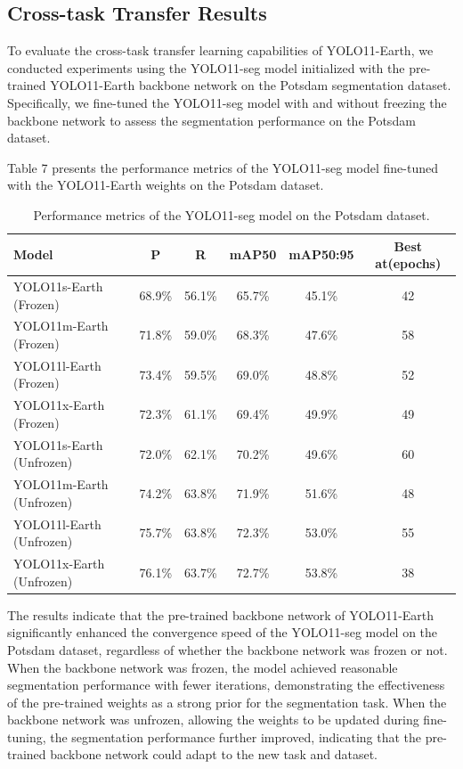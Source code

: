 \documentclass{article}
\begin{document}
\subsection{Cross-task Transfer Results}
To evaluate the cross-task transfer learning capabilities of YOLO11-Earth, we conducted experiments using the 
YOLO11-seg model initialized with the pre-trained YOLO11-Earth backbone network on the Potsdam segmentation 
dataset. Specifically, we fine-tuned the YOLO11-seg model with and without freezing the backbone network to 
assess the segmentation performance on the Potsdam dataset.

Table 7 presents the performance metrics of the YOLO11-seg model fine-tuned with the YOLO11-Earth weights on the Potsdam dataset.
\begin{table}[ht]
\centering
\caption{Performance metrics of the YOLO11-seg model on the Potsdam dataset.}
\begin{tabular}{lccccc}
\toprule
\textbf{Model} & \textbf{P} & \textbf{R} & \textbf{mAP50} & \textbf{mAP50:95} & \textbf{Best at(epochs)} \\
\midrule
YOLO11s-Earth (Frozen) & 68.9\% & 56.1\% & 65.7\% & 45.1\% & 42 \\
YOLO11m-Earth (Frozen) & 71.8\% & 59.0\% & 68.3\% & 47.6\% & 58 \\
YOLO11l-Earth (Frozen) & 73.4\% & 59.5\% & 69.0\% & 48.8\% & 52 \\
YOLO11x-Earth (Frozen) & 72.3\% & 61.1\% & 69.4\% & 49.9\% & 49 \\
YOLO11s-Earth (Unfrozen) & 72.0\% & 62.1\% & 70.2\% & 49.6\% & 60 \\
YOLO11m-Earth (Unfrozen) & 74.2\% & 63.8\% & 71.9\% & 51.6\% & 48 \\
YOLO11l-Earth (Unfrozen) & 75.7\% & 63.8\% & 72.3\% & 53.0\% & 55 \\
YOLO11x-Earth (Unfrozen) & 76.1\% & 63.7\% & 72.7\% & 53.8\% & 38 \\
\bottomrule
\end{tabular}
\end{table}
The results indicate that the pre-trained backbone network of YOLO11-Earth significantly enhanced the convergence 
speed of the YOLO11-seg model on the Potsdam dataset, regardless of whether the backbone network was frozen or 
not. When the backbone network was frozen, the model achieved reasonable segmentation performance with fewer 
iterations, demonstrating the effectiveness of the pre-trained weights as a strong prior for the segmentation 
task. When the backbone network was unfrozen, allowing the weights to be updated during fine-tuning, the 
segmentation performance further improved, indicating that the pre-trained backbone network could adapt to 
the new task and dataset.
\end{document}

